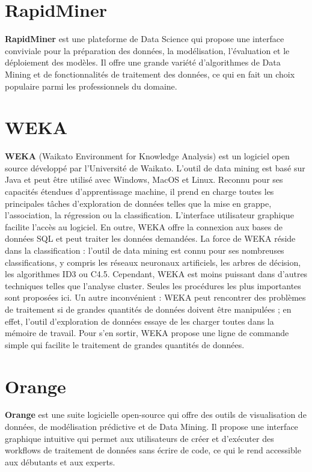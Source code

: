 \documentclass[a4paper,12pt]{report}
\begin{document}
    \section{RapidMiner}
    \textbf{RapidMiner} est une plateforme de Data Science qui propose une interface conviviale pour la préparation des données, la modélisation, l’évaluation et le déploiement des modèles. Il offre une grande variété d’algorithmes de Data Mining et de fonctionnalités de traitement des données, ce qui en fait un choix populaire parmi les professionnels du domaine.

    
    \section{WEKA}
    \textbf{WEKA} (Waikato Environment for Knowledge Analysis) est un logiciel open source développé par l'Université de Waikato. L'outil de data mining est basé sur Java et peut être utilisé avec Windows, MacOS et Linux. Reconnu pour ses capacités étendues d'apprentissage machine, il prend en charge toutes les principales tâches d'exploration de données telles que la mise en grappe, l'association, la régression ou la classification. L'interface utilisateur graphique facilite l'accès au logiciel. En outre, WEKA offre la connexion aux bases de données SQL et peut traiter les données demandées. La force de WEKA réside dans la classification : l'outil de data mining est connu pour ses nombreuses classifications, y compris les réseaux neuronaux artificiels, les arbres de décision, les algorithmes ID3 ou C4.5. Cependant, WEKA est moins puissant dans d'autres techniques telles que l'analyse cluster. Seules les procédures les plus importantes sont proposées ici. Un autre inconvénient : WEKA peut rencontrer des problèmes de traitement si de grandes quantités de données doivent être manipulées ; en effet, l'outil d'exploration de données essaye de les charger toutes dans la mémoire de travail. Pour s'en sortir, WEKA propose une ligne de commande simple qui facilite le traitement de grandes quantités de données. 

    
    \section{Orange}
    \textbf{Orange} est une suite logicielle open-source qui offre des outils de visualisation de données, de modélisation prédictive et de Data Mining. Il propose une interface graphique intuitive qui permet aux utilisateurs de créer et d’exécuter des workflows de traitement de données sans écrire de code, ce qui le rend accessible aux débutants et aux experts.
\end{document}
